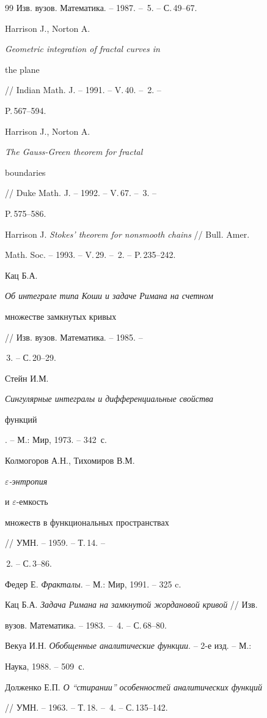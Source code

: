 \begin{thebibliography}{99}
Изв. вузов. Математика. -- 1987. -- \No\,5. -- С.\,49--67.




Harrison J., Norton A. {\em Geometric integration of fractal curves in


the plane} // Indian Math. J. -- 1991. -- V.\,40. -- \No\,2. --


P.\,567--594.




Harrison J., Norton A. {\em The Gauss-Green theorem for fractal


boundaries} // Duke Math. J. -- 1992. -- V.\,67. -- \No\,3. --


P.\,575--586.




Harrison J. {\em Stokes' theorem for nonsmooth chains} // Bull. Amer.


Math. Soc. -- 1993. -- V.\,29. -- \No\,2. -- P.\,235--242.




Кац Б.А. {\em Об интеграле типа Коши и задаче Римана на счетном


множестве замкнутых кривых} // Изв. вузов. Математика. -- 1985. --


\No\,3. -- С.\,20--29.




Стейн И.М. {\em Сингулярные интегралы и дифференциальные свойства


функций}. -- М.: Мир, 1973. -- 342~с.




Колмогоров А.Н., Тихомиров В.М. {\em $\varepsilon$-энтропия


и $\varepsilon$-емкость


множеств в функциональных пространствах} // УМН. -- 1959. -- Т.\,14. --


\No\,2. -- С.\,3--86.




Федер Е. {\em Фракталы}. -- М.: Мир, 1991. -- 325 c.




Кац Б.А. {\em Задача Римана на замкнутой жордановой кривой} // Изв.


вузов. Математика. -- 1983. -- \No\,4. -- С.\,68--80.




Векуа И.Н. {\em Обобщенные аналитические функции}. -- 2-е изд. -- М.:


Наука, 1988. -- 509~с.




Долженко Е.П. {\em О ``стирании'' особенностей аналитических функций}


// УМН. -- 1963. -- Т.\,18. -- \No\,4. -- С.\,135--142.





\end{thebibliography}





